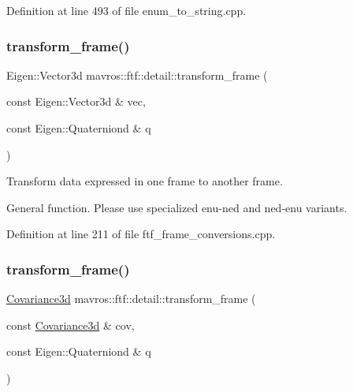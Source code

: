 Definition at line 493 of file enum\+\_\+to\+\_\+string.\+cpp.

\mbox{\label{group__nodelib_ga30dfcfe08b7c490b12664624277d2fe6}} 
\subsubsection{\texorpdfstring{transform\_frame()}{transform\_frame()}\hspace{0.1cm}{\footnotesize\ttfamily [1/4]}}
{\footnotesize\ttfamily Eigen\+::\+Vector3d mavros\+::ftf\+::detail\+::transform\+\_\+frame (\begin{DoxyParamCaption}\item[{const Eigen\+::\+Vector3d \&}]{vec,  }\item[{const Eigen\+::\+Quaterniond \&}]{q }\end{DoxyParamCaption})}



Transform data expressed in one frame to another frame. 

General function. Please use specialized enu-\/ned and ned-\/enu variants. 

Definition at line 211 of file ftf\+\_\+frame\+\_\+conversions.\+cpp.

\mbox{\label{group__nodelib_ga767c8e2dd868f4d8bbd78c38662a17bb}} 
\subsubsection{\texorpdfstring{transform\_frame()}{transform\_frame()}\hspace{0.1cm}{\footnotesize\ttfamily [2/4]}}
{\footnotesize\ttfamily \mbox{\hyperlink{group__nodelib_ga56776cc8f5410a6bfeafa085fcd6fe30}{Covariance3d}} mavros\+::ftf\+::detail\+::transform\+\_\+frame (\begin{DoxyParamCaption}\item[{const \mbox{\hyperlink{group__nodelib_ga56776cc8f5410a6bfeafa085fcd6fe30}{Covariance3d}} \&}]{cov,  }\item[{const Eigen\+::\+Quaterniond \&}]{q }\end{DoxyParamCaption})}



